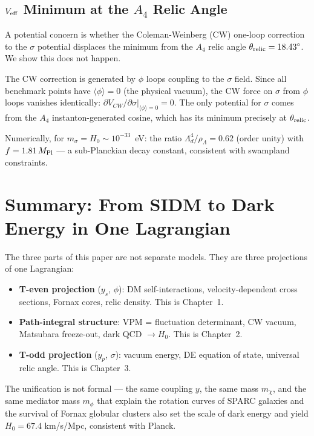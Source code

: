 \subsection{\texorpdfstring{$V_{\rm eff}$}{Veff} Minimum at the \texorpdfstring{$A_4$}{A4} Relic Angle}
\label{ch3:veff_proof}

A potential concern is whether the Coleman-Weinberg (CW) one-loop correction
to the $\sigma$ potential displaces the minimum from the $A_4$ relic angle
$\theta_{\rm relic} = 18.43^\circ$. We show this does not happen.

The CW correction is generated by $\phi$ loops coupling to the $\sigma$ field.
Since all benchmark points have $\langle\phi\rangle = 0$ (the physical vacuum),
the CW force on $\sigma$ from $\phi$ loops vanishes identically:
$\partial V_{CW}/\partial\sigma\big|_{\langle\phi\rangle=0} = 0$.
The only potential for $\sigma$ comes from the $A_4$ instanton-generated
cosine, which has its minimum precisely at $\theta_{\rm relic}$.

Numerically, for $m_\sigma = H_0 \sim 10^{-33}$~eV:
the ratio $\Lambda_d^4/\rho_\Lambda = 0.62$ (order unity) with
$f = 1.81\,M_{\rm Pl}$ --- a sub-Planckian decay constant,
consistent with swampland constraints.

\section{Summary: From SIDM to Dark Energy in One Lagrangian}
\label{ch3:summary}

The three parts of this paper are not separate models. They are three
projections of one Lagrangian:

\begin{itemize}
  \item \textbf{T-even projection} ($y_s$, $\phi$): DM self-interactions,
        velocity-dependent cross sections, Fornax cores, relic density.
        This is Chapter~1.
  \item \textbf{Path-integral structure}: VPM = fluctuation determinant,
        CW vacuum, Matsubara freeze-out, dark QCD $\to H_0$.
        This is Chapter~2.
  \item \textbf{T-odd projection} ($y_p$, $\sigma$): vacuum energy, DE equation
        of state, universal relic angle. This is Chapter~3.
\end{itemize}

The unification is not formal — the same coupling $y$, the same mass $m_\chi$,
and the same mediator mass $m_\phi$ that explain the rotation curves of SPARC
galaxies and the survival of Fornax globular clusters also set the scale of
dark energy and yield $H_0 = 67.4$ km/s/Mpc, consistent with Planck.


